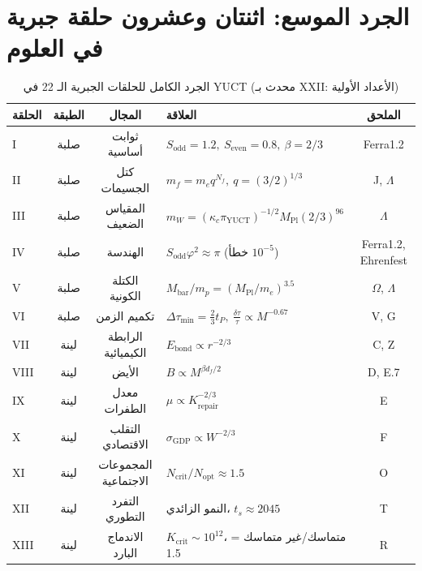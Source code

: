 \documentclass[12pt,a4paper]{article}
\begin{document}
	\section*{الجرد الموسع: اثنتان وعشرون حلقة جبرية في العلوم}
	
	\begin{otherlanguage}{english}
		\begin{table}[htbp]
			\centering
			\scriptsize
			\setlength{\tabcolsep}{2.5pt}
			\caption{الجرد الكامل للحلقات الجبرية الـ 22 في YUCT (محدث بـ XXII: الأعداد الأولية)}
			\label{tab:all-loops-22}
			\begin{tabular}{l c c p{3.2cm} c}
				\toprule
				\textbf{الحلقة} & \textbf{الطبقة} & \textbf{المجال} & \textbf{العلاقة} & \textbf{الملحق} \\
				\midrule
				I   & صلبة & ثوابت أساسية & \(S_{\mathrm{odd}}=1.2,\ S_{\mathrm{even}}=0.8,\ \beta=2/3\) & Ferra1.2 \\
				II  & صلبة & كتل الجسيمات & \(m_f = m_e q^{N_f},\ q=(3/2)^{1/3}\) & J, \(\Lambda\) \\
				III & صلبة & المقياس الضعيف & \(m_W = (\kappa_c \pi_{\mathrm{YUCT}})^{-1/2} M_{\mathrm{Pl}} (2/3)^{96}\) & \(\Lambda\) \\
				IV  & صلبة & الهندسة & \(S_{\mathrm{odd}}\varphi^2 \approx \pi\) (خطأ \(10^{-5}\)) & Ferra1.2, Ehrenfest \\
				V   & صلبة & الكتلة الكونية & \(M_{\mathrm{bar}}/m_p = (M_{\mathrm{Pl}}/m_e)^{3.5}\) & \(\Omega\), \(\Lambda\) \\
				VI  & صلبة & تكميم الزمن & \(\Delta\tau_{\min} = \frac{2}{3}t_P,\ \frac{\delta\tau}{\tau} \propto M^{-0.67}\) & V, G \\
				VII & لينة & الرابطة الكيميائية & \(E_{\mathrm{bond}} \propto r^{-2/3}\) & C, Z \\
				VIII& لينة & الأيض & \(B \propto M^{\beta d_f/2}\) & D, E.7 \\
				IX  & لينة & معدل الطفرات & \(\mu \propto K_{\mathrm{repair}}^{-2/3}\) & E \\
				X   & لينة & التقلب الاقتصادي & \(\sigma_{\mathrm{GDP}} \propto W^{-2/3}\) & F \\
				XI  & لينة & المجموعات الاجتماعية & \(N_{\mathrm{crit}}/N_{\mathrm{opt}} \approx 1.5\) & O \\
				XII & لينة & التفرد التطوري & النمو الزائدي، \(t_s \approx 2045\) & T \\
				XIII& لينة & الاندماج البارد & \(K_{\mathrm{crit}} \sim 10^{12}\)، متماسك/غير متماسك = 1.5 & R \\

\end{tabular}
\end{table}
\end{otherlanguage}
\end{document}
